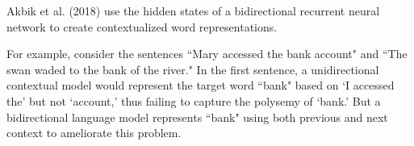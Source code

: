 Akbik et al. (2018) use the hidden states of a bidirectional recurrent neural network to create contextualized word representations. 

For example, consider the sentences ``Mary accessed the bank account" and ``The swan waded to the bank of the river." In the first sentence, a unidirectional contextual model would represent the target word ``bank" based on `I accessed the' but not `account,' thus failing to capture the polysemy of `bank.' But a bidirectional language model represents ``bank" using both previous and next context to ameliorate this problem.
